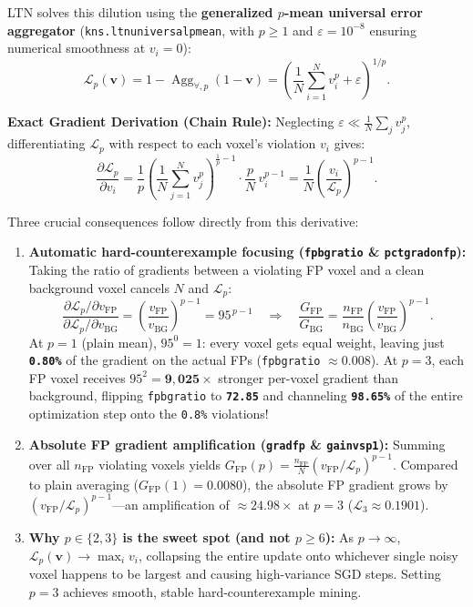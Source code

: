 \documentclass[10pt,a4paper]{article}
\renewcommand{\_}{\origunderscore\allowbreak}
\begin{document}
LTN solves this dilution using the \textbf{generalized $p$-mean universal error aggregator} (\texttt{kns.ltn\_universal\_pmean}, with $p \ge 1$ and $\varepsilon = 10^{-8}$ ensuring numerical smoothness at $v_i = 0$):
\[
\mathcal{L}_p(\mathbf{v}) = 1 - \operatorname{Agg}_{\forall, p}(1 - \mathbf{v}) = \left(\frac{1}{N}\sum_{i=1}^{N} v_i^{p} + \varepsilon\right)^{1/p}.
\]

\textbf{Exact Gradient Derivation (Chain Rule):} Neglecting $\varepsilon \ll \frac{1}{N}\sum_j v_j^p$, differentiating $\mathcal{L}_p$ with respect to each voxel's violation $v_i$ gives:
\[
\frac{\partial \mathcal{L}_p}{\partial v_i} = \frac{1}{p}\left(\frac{1}{N}\sum_{j=1}^{N} v_j^p\right)^{\frac{1}{p} - 1} \cdot \frac{p}{N}\,v_i^{p-1} = \frac{1}{N}\left(\frac{v_i}{\mathcal{L}_p}\right)^{p-1}.
\]

Three crucial consequences follow directly from this derivative:
\begin{enumerate}
\item \textbf{Automatic hard-counterexample focusing (\texttt{fp\_bg\_ratio} \& \texttt{pct\_grad\_on\_fp}):} Taking the ratio of gradients between a violating FP voxel and a clean background voxel cancels $N$ and $\mathcal{L}_p$:
\[
\frac{\partial \mathcal{L}_p / \partial v_{\text{FP}}}{\partial \mathcal{L}_p / \partial v_{\text{BG}}} = \left(\frac{v_{\text{FP}}}{v_{\text{BG}}}\right)^{p-1} = 95^{\,p-1} \quad\Longrightarrow\quad \frac{G_{\text{FP}}}{G_{\text{BG}}} = \frac{n_{\text{FP}}}{n_{\text{BG}}}\left(\frac{v_{\text{FP}}}{v_{\text{BG}}}\right)^{p-1}.
\]
At $p = 1$ (plain mean), $95^0 = 1$: every voxel gets equal weight, leaving just \textbf{\texttt{0.80\%}} of the gradient on the actual FPs (\texttt{fp\_bg\_ratio} $\approx 0.008$). At \textbf{$p = 3$}, each FP voxel receives $95^2 = \mathbf{9{,}025\times}$ stronger per-voxel gradient than background, flipping \texttt{fp\_bg\_ratio} to \textbf{\texttt{72.85}} and channeling \textbf{\texttt{98.65\%}} of the entire optimization step onto the \texttt{0.8\%} violations!
\item \textbf{Absolute FP gradient amplification (\texttt{grad\_fp} \& \texttt{gain\_vs\_p1}):} Summing over all $n_{\text{FP}}$ violating voxels yields $G_{\text{FP}}(p) = \frac{n_{\text{FP}}}{N}\left(v_{\text{FP}} / \mathcal{L}_p\right)^{p-1}$. Compared to plain averaging ($G_{\text{FP}}(1) = 0.0080$), the absolute FP gradient grows by $\left(v_{\text{FP}} / \mathcal{L}_p\right)^{p-1}$---an amplification of \textbf{$\approx 24.98\times$} at $p = 3$ ($\mathcal{L}_3 \approx 0.1901$).
\item \textbf{Why $p \in \{2, 3\}$ is the sweet spot (and not $p \ge 6$):} As $p \to \infty$, $\mathcal{L}_p(\mathbf{v}) \to \max_i v_i$, collapsing the entire update onto whichever single noisy voxel happens to be largest and causing high-variance SGD steps. Setting $p = 3$ achieves smooth, stable hard-counterexample mining.
\end{enumerate}
\end{document}
